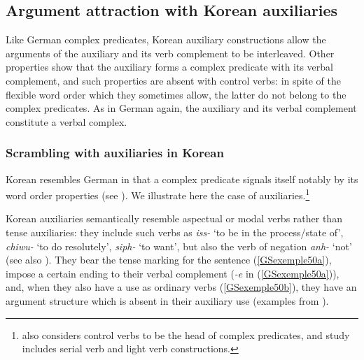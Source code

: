 {\subsection{Argument attraction with Korean auxiliaries}\label{GSsection4.2}

Like German complex predicates, Korean auxiliary constructions allow the arguments of the auxiliary and its verb complement to be interleaved. 
Other properties show that the auxiliary forms a complex predicate with its verbal complement, and such properties are absent with control verbs: in spite of the flexible word order which they sometimes allow, the latter do not belong to the complex predicates. 
As in German again, the auxiliary and its verbal complement constitute a verbal complex.

\subsubsection{Scrambling with auxiliaries in Korean}\label{GSsection4.2.1}
 
 
Korean resembles German in that a complex predicate signals itself notably by its word order properties (see \citealt{Sells1991, Chung98a-u, Yoo2003, Kim2016a-u}). We illustrate here the case of auxiliaries.\footnote{\cite{Chung98a-u} also considers control verbs to be the head of complex predicates, and  study includes serial verb and light verb constructions.} 

Korean auxiliaries semantically resemble aspectual or modal verbs rather than tense auxiliaries:
they include such verbs as \emph{iss-} `to be in the process/state of', \emph{chiwu-} `to do
resolutely’, \emph{siph-} `to want', but also the verb of negation \emph{anh-} `not' (see also ). They bear the tense marking for the sentence (\ref{GSexemple50a}), impose a certain ending to their verbal complement (\emph{-e} in (\ref{GSexemple50a})), and, when they also have a use as ordinary verbs (\ref{GSexemple50b}), they have an argument structure which is absent in their auxiliary use (examples from \citealt[85--86]{Kim2016a-u}).

\eal
	\label{GSexemple50} 
    \label{GSexemple50a}

    \label{GSexemple50b}
\zl

}
